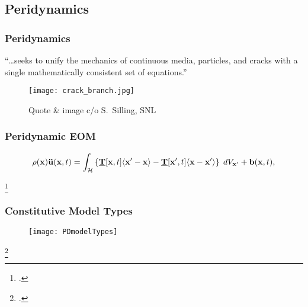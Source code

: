 \subsection{Peridynamics}
%
\begin{frame}
  \frametitle{Peridynamics}
  \begin{center}
    \justify
    ``\ldots seeks to unify the mechanics of continuous media, particles, and cracks with a single mathematically consistent set of equations.''
  \end{center}

  \begin{figure}
      \centering
      \texttt{[image: crack\_branch.jpg]}
      \caption{Quote \& image c/o S.~Silling, SNL}
  \end{figure}
  

\end{frame}
%
%
%
\begin{frame}
  \frametitle{Peridynamic EOM}
%
\begin{equation*}
\rho(\mathbf{x})\mathbf{\ddot{u}}(\mathbf{x},t) = \int_\mathcal{H} \left\{\vstate{T}{\mathbf{x},t}{\mathbf{x'}-\mathbf{x}}-\vstate{T}{\mathbf{x'},t}{\mathbf{x}-\mathbf{x'}}\right\} \; dV_{\mathbf{x'}} + \mathbf{b}(\mathbf{x},t),
\end{equation*}
%
\begin{figure}
    \centering
    \scalebox{0.6}{}
\end{figure}
\footcite{silling:psa}
%
%
\end{frame}
%
%
\begin{frame}
  \frametitle{Constitutive Model Types}
%
\begin{figure}
    \centering
    \texttt{[image: PDmodelTypes]}
\end{figure}
\footcite{silling:psa}

%
\end{frame}
%
